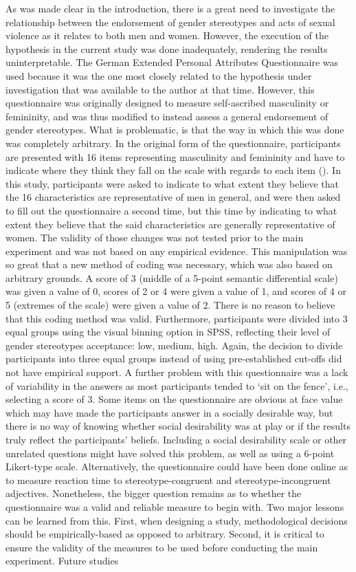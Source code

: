 \documentclass[serif, twocolumn, numeric, empirical]{jote-article}
\begin{document}
As was made clear in the introduction, there is a great need to investigate the relationship between the endorsement of gender stereotypes and acts of sexual violence as it relates to both men and women. However, the execution of the hypothesis in the current study was done inadequately, rendering the results uninterpretable. The German Extended Personal Attributes Questionnaire was used because it was the one most closely related to the hypothesis under investigation that was available to the author at that time. However, this questionnaire was originally designed to measure self-ascribed masculinity or femininity, and was thus modified to instead assess a general endorsement of gender stereotypes. What is problematic, is that the way in which this was done was completely arbitrary. In the original form of the questionnaire, participants are presented with 16 items representing masculinity and femininity and have to indicate where they think they fall on the scale with regards to each item (\cite{RungeFreyGollwitzerHelmreichSpence1981}). In this study, participants were asked to indicate to what extent they believe that the 16 characteristics are representative of men in general, and were then asked to fill out the questionnaire a second time, but this time by indicating to what extent they believe that the said characteristics are generally representative of women. The validity of those changes was not tested prior to the main experiment and was not based on any empirical evidence. This manipulation was so great that a new method of coding was necessary, which was also based on arbitrary grounds. A score of 3 (middle of a 5-point semantic differential scale) was given a value of 0, scores of 2 or 4 were given a value of 1, and scores of 4 or 5 (extremes of the scale) were given a value of 2. There is no reason to believe that this coding method was valid. Furthermore, participants were divided into 3 equal groups using the visual binning option in SPSS, reflecting their level of gender stereotypes acceptance: low, medium, high. Again, the decision to divide participants into three equal groups instead of using pre-established cut-offs did not have empirical support. A further problem with this questionnaire was a lack of variability in the answers as most participants tended to ‘sit on the fence’, i.e., selecting a score of 3. Some items on the questionnaire are obvious at face value which may have made the participants answer in a socially desirable way, but there is no way of knowing whether social desirability was at play or if the results truly reflect the participants’ beliefs. Including a social desirability scale or other unrelated questions might have solved this problem, as well as using a 6-point Likert-type scale. Alternatively, the questionnaire could have been done online as to measure reaction time to stereotype-congruent and stereotype-incongruent adjectives. Nonetheless, the bigger question remains as to whether the questionnaire was a valid and reliable measure to begin with. Two major lessons can be learned from this. First, when designing a study, methodological decisions should be empirically-based as opposed to arbitrary. Second, it is critical to ensure the validity of the measures to be used before conducting the main experiment. Future studies 
\end{document}
